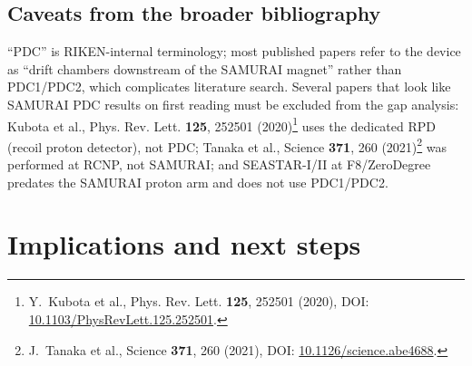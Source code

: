 \documentclass[a4paper, 11pt]{article}
\begin{document}
\subsection{Caveats from the broader bibliography}
``PDC'' is RIKEN-internal terminology; most published papers refer to the device as ``drift chambers downstream of the SAMURAI magnet'' rather than PDC1/PDC2, which complicates literature search. Several papers that look like SAMURAI PDC results on first reading must be excluded from the gap analysis: Kubota et al., Phys. Rev. Lett. \textbf{125}, 252501 (2020)\footnote{\label{fn:kubota2020}Y.~Kubota et al., Phys. Rev. Lett. \textbf{125}, 252501 (2020), DOI: \href{https://doi.org/10.1103/PhysRevLett.125.252501}{10.1103/PhysRevLett.125.252501}.} uses the dedicated RPD (recoil proton detector), not PDC; Tanaka et al., Science \textbf{371}, 260 (2021)\footnote{\label{fn:tanaka2021}J.~Tanaka et al., Science \textbf{371}, 260 (2021), DOI: \href{https://doi.org/10.1126/science.abe4688}{10.1126/science.abe4688}.} was performed at RCNP, not SAMURAI; and SEASTAR-I/II at F8/ZeroDegree predates the SAMURAI proton arm and does not use PDC1/PDC2.

\section{Implications and next steps}
\end{document}
